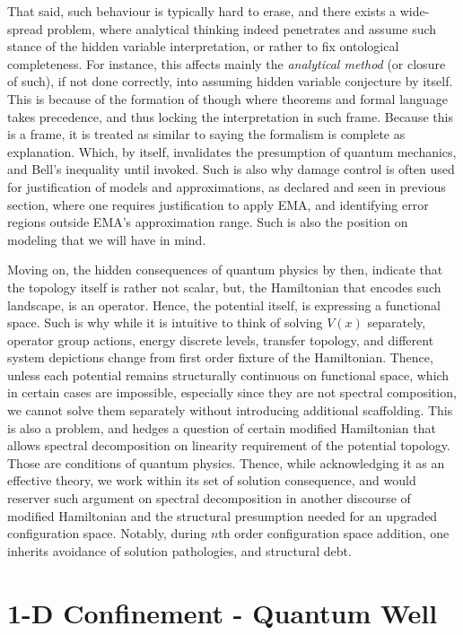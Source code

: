 \documentclass[%
 reprint,
 amsmath,amssymb,
 aps,
]{revtex4-2}
\begin{document}
That said, such behaviour is typically hard to erase, and there exists a wide-spread problem, where analytical thinking indeed penetrates and assume such stance of the hidden variable interpretation, or rather to fix ontological completeness. For instance, this affects mainly the \textit{analytical method} (or closure of such), if not done correctly, into assuming hidden variable conjecture by itself. This is because of the formation of though where theorems and formal language takes precedence, and thus locking the interpretation in such frame. Because this is a frame, it is treated as similar to saying the formalism is complete as explanation. Which, by itself, invalidates the presumption of quantum mechanics, and Bell's inequality until invoked. Such is also why damage control is often used for justification of models and approximations, as declared and seen in previous section, where one requires justification to apply EMA, and identifying error regions outside EMA's approximation range. Such is also the position on modeling that we will have in mind. 

Moving on, the hidden consequences of quantum physics by then, indicate that the topology itself is rather not scalar, but, the Hamiltonian that encodes such landscape, is an operator. Hence, the potential itself, is expressing a functional space. Such is why while it is intuitive to think of solving $V(x)$ separately, operator group actions, energy discrete levels, transfer topology, and different system depictions change from first order fixture of the Hamiltonian. Thence, unless each potential remains structurally continuous on functional space, which in certain cases are impossible, especially since they are not spectral composition, we cannot solve them separately without introducing additional scaffolding. This is also a problem, and hedges a question of certain modified Hamiltonian that allows spectral decomposition on linearity requirement of the potential topology. Those are conditions of quantum physics. Thence, while acknowledging it as an effective theory, we work within its set of solution consequence, and would reserver such argument on spectral decomposition in another discourse of modified Hamiltonian and the structural presumption needed for an upgraded configuration space. Notably, during $n$th order configuration space addition, one inherits avoidance of solution pathologies, and structural debt.

\section{1-D Confinement - Quantum Well}
\end{document}
